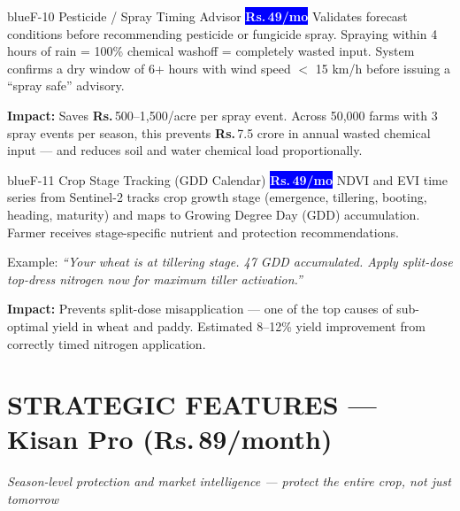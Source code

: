 \documentclass[12pt,a4paper]{article}
\newcommand{\Rup}{\textbf{Rs.\,}}
\newcommand{\saathibadge}{\textcolor{white}{\colorbox{blue}{\footnotesize\textbf{\Rup49/mo}}}}
\begin{document}
\begin{featurebox}{blue}{F-10 \quad Pesticide / Spray Timing Advisor \quad \saathibadge}
Validates forecast conditions before recommending pesticide or fungicide spray. Spraying within 4 hours of rain = 100\% chemical washoff = completely wasted input. System confirms a dry window of 6+ hours with wind speed $<$ 15 km/h before issuing a ``spray safe'' advisory.

\textbf{Impact:} Saves \Rup500--1,500/acre per spray event. Across 50,000 farms with 3 spray events per season, this prevents \Rup7.5 crore in annual wasted chemical input --- and reduces soil and water chemical load proportionally.
\end{featurebox}

\begin{featurebox}{blue}{F-11 \quad Crop Stage Tracking (GDD Calendar) \quad \saathibadge}
NDVI and EVI time series from Sentinel-2 tracks crop growth stage (emergence, tillering, booting, heading, maturity) and maps to Growing Degree Day (GDD) accumulation. Farmer receives stage-specific nutrient and protection recommendations.

Example: \textit{``Your wheat is at tillering stage. 47 GDD accumulated. Apply split-dose top-dress nitrogen now for maximum tiller activation.''}

\textbf{Impact:} Prevents split-dose misapplication --- one of the top causes of sub-optimal yield in wheat and paddy. Estimated 8--12\% yield improvement from correctly timed nitrogen application.
\end{featurebox}

\section{STRATEGIC FEATURES --- Kisan Pro (\Rup89/month)}
\textit{Season-level protection and market intelligence --- protect the entire crop, not just tomorrow}
\end{document}
